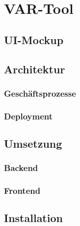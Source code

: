 \chapter{VAR-Tool}
\section{UI-Mockup}
\section{Architektur}
\subsection{Geschäftsprozesse}
\subsection{Deployment}
\section{Umsetzung}
\subsection{Backend}
\subsection{Frontend}
\section{Installation}
